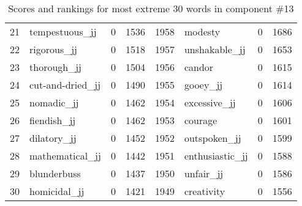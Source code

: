 \begin{table}[tbp]
\begin{tabular}{| rlr@{.}l | rlr@{.}l |}
    21 & tempestuous\_jj & 0 & 1536    &    1958 & modesty & 0 & 1686 \\
    22 & rigorous\_jj & 0 & 1518    &    1957 & unshakable\_jj & 0 & 1653 \\
    23 & thorough\_jj & 0 & 1504    &    1956 & candor & 0 & 1615 \\
    24 & cut-and-dried\_jj & 0 & 1490    &    1955 & gooey\_jj & 0 & 1614 \\
    25 & nomadic\_jj & 0 & 1462    &    1954 & excessive\_jj & 0 & 1606 \\
    26 & fiendish\_jj & 0 & 1462    &    1953 & courage & 0 & 1601 \\
    27 & dilatory\_jj & 0 & 1452    &    1952 & outspoken\_jj & 0 & 1599 \\
    28 & mathematical\_jj & 0 & 1442    &    1951 & enthusiastic\_jj & 0 & 1588 \\
    29 & blunderbuss & 0 & 1437    &    1950 & unfair\_jj & 0 & 1586 \\
    30 & homicidal\_jj & 0 & 1421    &    1949 & creativity & 0 & 1556 \\
    \hline
    \end{tabular}
    \caption{Scores and rankings for most extreme 30 words in component \#13} 
\end{table}
\clearpage
